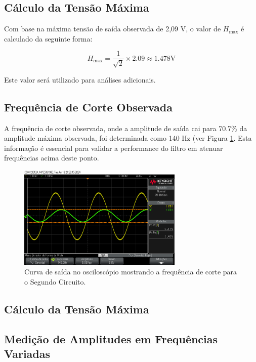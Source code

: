 \documentclass[
	12pt,				%
	openright,			%
	twoside,			%
	a4paper,			%
	english,			%
	french,				%
	spanish,			%
	brazil,				%
	]{abntex2}
\begin{document}
\subsection{Cálculo da Tensão Máxima}

Com base na máxima tensão de saída observada de 2,09 V, o valor de \( H_{\text{max}} \) é calculado da seguinte forma:

\begin{equation}
H_{\text{max}} = \frac{1}{\sqrt{2}} \times 2.09 \approx 1.478 \text{V}
\end{equation}

Este valor será utilizado para análises adicionais.

\subsection{Frequência de Corte Observada}
A frequência de corte observada, onde a amplitude de saída cai para 70.7\% da amplitude máxima observada, foi determinada como 140 Hz (ver Figura \ref{fig:second_oscilloscope_cutoff_frequency}. Esta informação é essencial para validar a performance do filtro em atenuar frequências acima deste ponto.

\begin{figure}[H]
    \centering
    \includegraphics[width=0.7\textwidth]{imgs/second_oscilloscope_cutoff_frequency.jpg}
    \caption{Curva de saída no osciloscópio mostrando a frequência de corte para o Segundo Circuito.}
    \label{fig:second_oscilloscope_cutoff_frequency}
\end{figure}
\subsection{Cálculo da Tensão Máxima}


\subsection{Medição de Amplitudes em Frequências Variadas}
\end{document}
